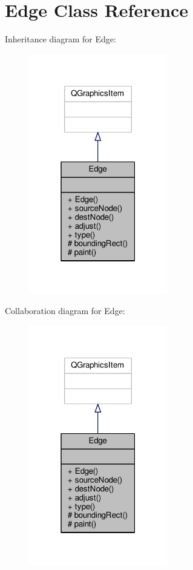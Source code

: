 \hypertarget{classEdge}{}\section{Edge Class Reference}
\label{classEdge}


Inheritance diagram for Edge\+:
\nopagebreak
\begin{figure}[H]
\begin{center}
\leavevmode
\includegraphics[width=171pt]{classEdge__inherit__graph}
\end{center}
\end{figure}


Collaboration diagram for Edge\+:
\nopagebreak
\begin{figure}[H]
\begin{center}
\leavevmode
\includegraphics[width=171pt]{classEdge__coll__graph}
\end{center}
\end{figure}

